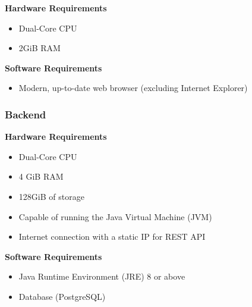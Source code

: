 \textbf{Hardware Requirements}
\begin{itemize}
    \item Dual-Core CPU
    \item 2GiB RAM
\end{itemize}

\textbf{Software Requirements}
\begin{itemize}
    \item Modern, up-to-date web browser (excluding Internet Explorer)
\end{itemize}

\subsubsection{Backend}

\textbf{Hardware Requirements}
\begin{itemize}
    \item Dual-Core CPU
    \item 4 GiB RAM
    \item 128GiB of storage
    \item Capable of running the Java Virtual Machine (JVM)
    \item Internet connection with a static IP for REST API
\end{itemize}

\textbf{Software Requirements}
\begin{itemize}
    \item Java Runtime Environment (JRE) 8 or above
    \item Database (PostgreSQL)
\end{itemize}
